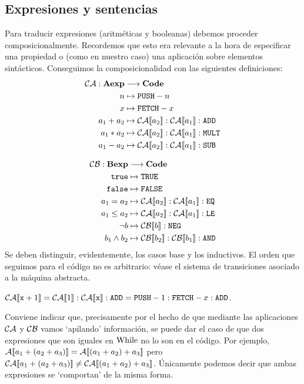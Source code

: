 \subsection{Expresiones y sentencias}

Para traducir expresiones (aritméticas y booleanas) debemos proceder composicionalmente. Recordemos que esto era relevante a la hora de especificar una propiedad o (como en nuestro caso) una aplicación sobre elementos sintácticos. Conseguimos la composicionalidad con las siguientes definiciones:
\begin{align*}
    \mc{CA}: \mathbf{Aexp} &\longrightarrow\mathbf{Code}\\
    n &\mapsto \n{PUSH}-n\\
    x &\mapsto \n{FETCH}-x\\
    a_1 + a_2&\mapsto \fc{CA}{a_2}:\fc{CA}{a_1}: \n{ADD}\\
    a_1 * a_2&\mapsto \fc{CA}{a_2}:\fc{CA}{a_1}: \n{MULT}\\
    a_1 - a_2&\mapsto \fc{CA}{a_2}:\fc{CA}{a_1}: \n{SUB}
\end{align*}

\begin{align*}
    \mc{CB}: \mathbf{Bexp} &\longrightarrow\mathbf{Code}\\
    \n{true} &\mapsto \n{TRUE}\\
    \n{false} &\mapsto \n{FALSE}\\
    a_1 = a_2&\mapsto \fc{CA}{a_2}:\fc{CA}{a_1}: \n{EQ}\\
    a_1 \leq a_2&\mapsto \fc{CA}{a_2}:\fc{CA}{a_1}: \n{LE}\\
    \neg b&\mapsto \fc{CB}{b}:\n{NEG}\\
    b_1 \land b_2&\mapsto \fc{CB}{b_2}:\fc{CB}{b_1}: \n{AND}
\end{align*}
Se deben distinguir, evidentemente, los casos base y los inductivos. El orden que seguimos para el código no es arbitrario: véase el sistema de transiciones asociado a la máquina abstracta. 

\begin{example}
$\mathcal{CA}[\![\texttt{x}+1]\!]= \mathcal{CA}[\![1]\!]:\mathcal{CA}[\![\texttt{x}]\!]:\texttt{ADD} = \texttt{PUSH}-1:\texttt{FETCH}-x:\texttt{ADD}$.
\end{example}

Conviene indicar que, precisamente por el hecho de que mediante las aplicaciones $\mathcal{CA}$ y $\mathcal{CB}$ vamos `apilando' información, se puede dar el caso de que dos expresiones que son iguales en $\mathrm{While}$ no lo son en el código. Por ejemplo, $\mathcal{A}[\![a_1+(a_2 + a_3)]\!]= \mathcal{A}[\![(a_1+a_2)+a_3]\!]$ pero $\mathcal{CA}[\![a_1+(a_2 + a_3)]\!]\neq \mathcal{CA}[\![(a_1+a_2)+a_3]\!]$. Únicamente podemos decir que ambas expresiones se `comportan' de la misma forma.
\\


